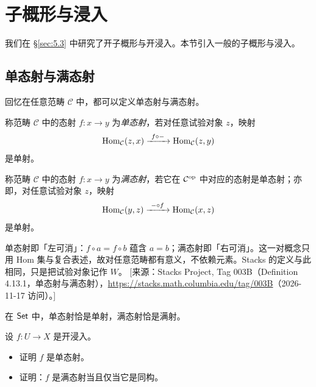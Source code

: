 
\providecommand{\cQ}{\mathcal{Q}}
\providecommand{\supp}{\operatorname{supp}}

\section{子概形与浸入}\label{sec:11}

我们在 \S\ref{sec:5.3} 中研究了开子概形与开浸入。本节引入一般的子概形与浸入。

\subsection{单态射与满态射}\label{sec:11.1}

回忆在任意范畴 $\mathcal{C}$ 中，都可以定义单态射与满态射。

\begin{definition}\label{def:11.1.1}
称范畴 $\mathcal{C}$ 中的态射 $f \colon x \to y$ 为\emph{单态射}，若对任意试验对象 $z$，映射
\[
\operatorname{Hom}_{\mathcal{C}}(z,x) \xrightarrow{\ f \circ -\ } \operatorname{Hom}_{\mathcal{C}}(z,y)
\]
是单射。

称范畴 $\mathcal{C}$ 中的态射 $f \colon x \to y$ 为\emph{满态射}，若它在 $\mathcal{C}^{\mathrm{op}}$ 中对应的态射是单态射；亦即，对任意试验对象 $z$，映射
\[
\Hom_{\mathcal{C}}(y,z) \xrightarrow{\ -\circ f\ } \Hom_{\mathcal{C}}(x,z)
\]
是单射。
\end{definition}

\begin{yizhu}
单态射即「左可消」：$f \circ a = f \circ b$ 蕴含 $a = b$；满态射即「右可消」。这一对概念只用 Hom 集与复合表述，故对任意范畴都有意义，不依赖元素。Stacks 的定义与此相同，只是把试验对象记作 $W$。
[来源：Stacks Project, Tag 003B（Definition 4.13.1，单态射与满态射），\url{https://stacks.math.columbia.edu/tag/003B}（2026-11-17 访问）。]
\end{yizhu}

\begin{example}\label{ex:11.1.2}
在 $\mathsf{Set}$ 中，单态射恰是单射，满态射恰是满射。
\end{example}

\begin{exercise}\label{exc:11.1.3}
设 $f \colon U \to X$ 是开浸入。
\begin{itemize}[leftmargin=2em,itemsep=0.25ex]
  \item 证明 $f$ 是单态射。
  \item 证明：$f$ 是满态射当且仅当它是同构。
\end{itemize}
\end{exercise}

